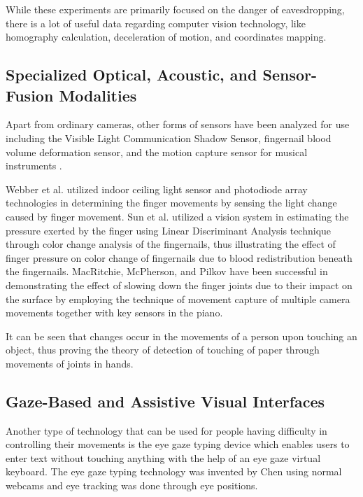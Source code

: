 While these experiments are primarily focused on the danger of eavesdropping, there is a lot of useful data regarding computer vision technology, like homography calculation, deceleration of motion, and coordinates mapping.

\subsection{Specialized Optical, Acoustic, and Sensor-Fusion Modalities}
\label{subsec:lit_specialized_systems}
Apart from ordinary cameras, other forms of sensors have been analyzed for use including the Visible Light Communication Shadow Sensor, fingernail blood volume deformation sensor, and the motion capture sensor for musical instruments \cite{Webber2021Finger, Sun2009Estimation, MacRitchie2015Integrating, Pilkov2024Markerless}.

Webber et al. \cite{Webber2021Finger} utilized indoor ceiling light sensor and photodiode array technologies in determining the finger movements by sensing the light change caused by finger movement. Sun et al. \cite{Sun2009Estimation} utilized a vision system in estimating the pressure exerted by the finger using Linear Discriminant Analysis technique through color change analysis of the fingernails, thus illustrating the effect of finger pressure on color change of fingernails due to blood redistribution beneath the fingernails. MacRitchie, McPherson, and Pilkov \cite{MacRitchie2015Integrating, Pilkov2024Markerless} have been successful in demonstrating the effect of slowing down the finger joints due to their impact on the surface by employing the technique of movement capture of multiple camera movements together with key sensors in the piano.

It can be seen that changes occur in the movements of a person upon touching an object, thus proving the theory of detection of touching of paper through movements of joints in hands.

\subsection{Gaze-Based and Assistive Visual Interfaces}
\label{subsec:lit_gaze_interfaces}
Another type of technology that can be used for people having difficulty in controlling their movements is the eye gaze typing device which enables users to enter text without touching anything with the help of an eye gaze virtual keyboard. The eye gaze typing technology was invented by Chen \cite{Chen2024Gaze} using normal webcams and eye tracking was done through eye positions.

